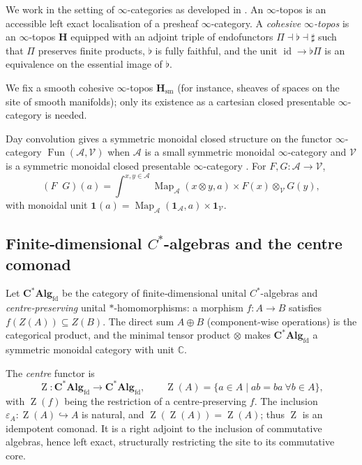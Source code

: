 \documentclass[12pt,a4paper]{article}
\theoremstyle{plain}
\theoremstyle{definition}
\DeclareMathOperator{\id}{id}
\DeclareMathOperator{\Map}{Map}
\DeclareMathOperator{\Fun}{Fun}
\DeclareMathOperator{\Center}{Z}
\DeclareMathOperator{\Day}{\otimes_{\mathrm{Day}}}
\newcommand{\CAlgfd}{\mathbf{C}^{*}\mathbf{Alg}_{\mathrm{fd}}}
\begin{document}
We work in the setting of \(\infty\)-categories as developed in \cite{Lurie2009, LurieHA}.  An \(\infty\)-topos is an accessible left exact localisation of a presheaf \(\infty\)-category. A \emph{cohesive \(\infty\)-topos} \cite[Definition~3.4.1]{Schreiber13} is an \(\infty\)-topos \(\mathbf{H}\) equipped with an adjoint triple of endofunctors \(\Pi \dashv \flat \dashv \sharp\) such that \(\Pi\) preserves finite products, \(\flat\) is fully faithful, and the unit \(\id \to \flat\Pi\) is an equivalence on the essential image of \(\flat\).

We fix a smooth cohesive \(\infty\)-topos \(\mathbf{H}_{\mathrm{sm}}\) (for instance, sheaves of spaces on the site of smooth manifolds); only its existence as a cartesian closed presentable \(\infty\)-category is needed.

Day convolution gives a symmetric monoidal closed structure on the functor \(\infty\)-category \(\Fun(\mathcal{A},\mathcal{V})\) when \(\mathcal{A}\) is a small symmetric monoidal \(\infty\)-category and \(\mathcal{V}\) is a symmetric monoidal closed presentable \(\infty\)-category \cite[Section~2.2.6]{LurieHA}.  For \(F,G:\mathcal{A}\to\mathcal{V}\),
\[
(F \Day G)(a) = \int^{x,y\in\mathcal{A}} \Map_{\mathcal{A}}(x\otimes y,a) \times F(x)\otimes_{\mathcal{V}} G(y),
\]
with monoidal unit \(\mathbf{1}_{\Day}(a) = \Map_{\mathcal{A}}(\mathbf{1}_{\mathcal{A}},a) \times \mathbf{1}_{\mathcal{V}}\).

\subsection{Finite‑dimensional \(C^{*}\)-algebras and the centre comonad}
Let \(\CAlgfd\) be the category of finite‑dimensional unital \(C^{*}\)-algebras and \emph{centre‑preserving} unital \(*\)-homomorphisms: a morphism \(f:A\to B\) satisfies \(f(Z(A))\subseteq Z(B)\).  The direct sum \(A\oplus B\) (component‑wise operations) is the categorical product, and the minimal tensor product \(\otimes\) makes \(\CAlgfd\) a symmetric monoidal category with unit \(\mathbb{C}\).

The \emph{centre} functor is
\[
\Center : \CAlgfd \to \CAlgfd,\qquad \Center(A) = \{a\in A \mid ab=ba\ \forall b\in A\},
\]
with \(\Center(f)\) being the restriction of a centre‑preserving \(f\).  The inclusion \(\varepsilon_A : \Center(A) \hookrightarrow A\) is natural, and \(\Center(\Center(A)) = \Center(A)\); thus \(\Center\) is an idempotent comonad.  It is a right adjoint to the inclusion of commutative algebras, hence left exact, structurally restricting the site to its commutative core.
\end{document}
